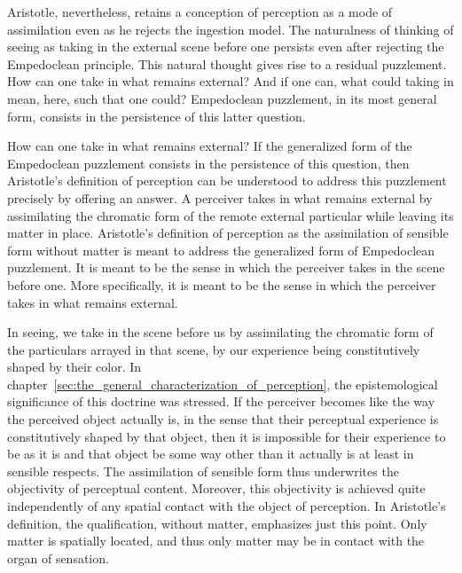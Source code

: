 Aristotle, nevertheless, retains a conception of perception as a mode of assimilation even as he rejects the ingestion model. The naturalness of thinking of seeing as taking in the external scene before one persists even after rejecting the Empedoclean principle. This natural thought gives rise to a residual puzzlement. How can one take in what remains external? And if one can, what could taking in mean, here, such that one could? Empedoclean puzzlement, in its most general form, consists in the persistence of this latter question.

How can one take in what remains external? If the generalized form of the Empedoclean puzzlement consists in the persistence of this question, then Aristotle's definition of perception can be understood to address this puzzlement precisely by offering an answer. A perceiver takes in what remains external by assimilating the chromatic form of the remote external particular while leaving its matter in place. Aristotle's definition of perception as the assimilation of sensible form without matter is meant to address the generalized form of Empedoclean puzzlement. It is meant to be the sense in which the perceiver takes in the scene before one. More specifically, it is meant to be the sense in which the perceiver takes in what remains external. 

In seeing, we take in the scene before us by assimilating the chromatic form of the particulars arrayed in that scene, by our experience being constitutively shaped by their color. In chapter~\ref{sec:the_general_characterization_of_perception}, the epistemological significance of this doctrine was stressed. If the perceiver becomes like the way the perceived object actually is, in the sense that their perceptual experience is constitutively shaped by that object, then it is impossible for their experience to be as it is and that object be some way other than it actually is at least in sensible respects. The assimilation of sensible form thus underwrites the objectivity of perceptual content. Moreover, this objectivity is achieved quite independently of any spatial contact with the object of perception. In Aristotle's definition, the qualification, without matter, emphasizes just this point. Only matter is spatially located, and thus only matter may be in contact with the organ of sensation.

